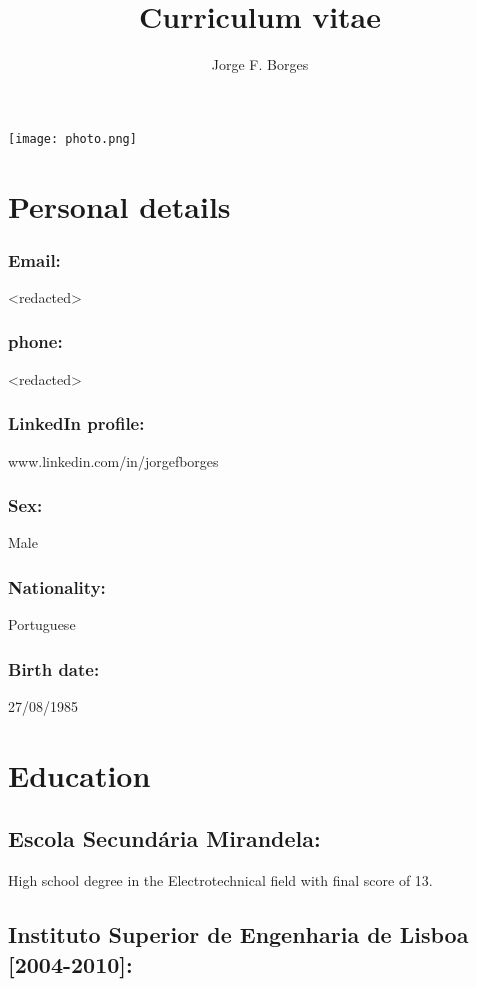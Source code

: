 \documentclass{article}
\renewcommand{\maketitle}{
\begin{minipage}[t]{0.21\textwidth}
\vspace{0pt} %
\texttt{[image: photo.png]}
\end{minipage}
\begin{center}
\huge\bfseries
\begin{center}
\theauthor
\vspace{.25em}
\end{center}
\end{center}

\begin{center}
{\bfseries
\thetitle}
\begin{center}
\vspace{.25em}
\end{center}
\end{center}
}
\begin{document}
\title{Curriculum vitae}
\author{Jorge F. Borges}

\maketitle

\section{Personal details}

\subsubsection{Email:} 
<redacted>

\subsubsection{phone:}
<redacted>

\subsubsection{LinkedIn profile:} 
www.linkedin.com/in/jorgefborges

\subsubsection{Sex:}
Male 

\subsubsection{Nationality:}
Portuguese 

\subsubsection{Birth date:} 
27/08/1985

\section{Education}

\subsection{Escola Secundária Mirandela:}

High school degree in the Electrotechnical field with final score of 13.

\subsection{Instituto Superior de Engenharia de Lisboa [2004-2010]:}
\end{document}
